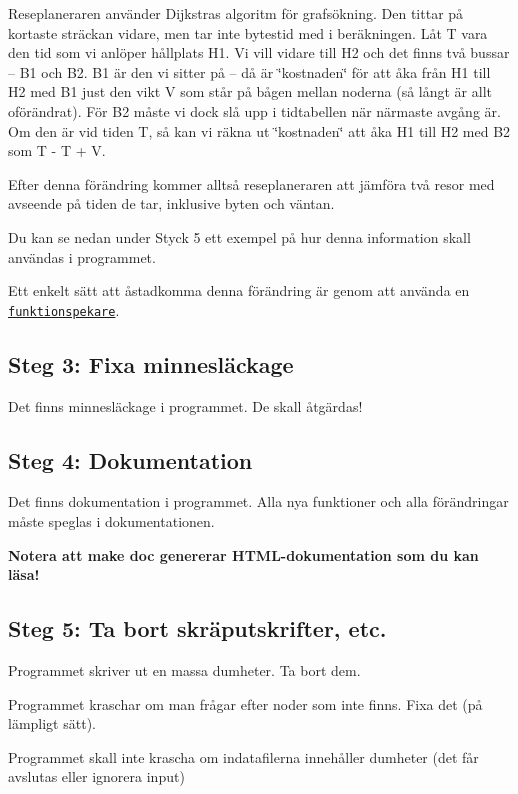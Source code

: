 Reseplaneraren använder Dijkstras algoritm för grafsökning. Den tittar på kortaste sträckan vidare, men tar inte bytestid med i beräkningen. Låt T vara den tid som vi anlöper hållplats H1. Vi vill vidare till H2 och det finns två bussar -- B1 och B2. B1 är den vi sitter på -- då är \char`\"{}kostnaden\char`\"{} för att åka från H1 till H2 med B1 just den vikt V som står på bågen mellan noderna (så långt är allt oförändrat). För B2 måste vi dock slå upp i tidtabellen när närmaste avgång är. Om den är vid tiden T\textquotesingle{}, så kan vi räkna ut \char`\"{}kostnaden\char`\"{} att åka H1 till H2 med B2 som T\textquotesingle{} -\/ T + V.

Efter denna förändring kommer alltså reseplaneraren att jämföra två resor med avseende på tiden de tar, inklusive byten och väntan.

Du kan se nedan under Styck 5 ett exempel på hur denna information skall användas i programmet.

Ett enkelt sätt att åstadkomma denna förändring är genom att använda en \href{http://c.learncodethehardway.org/book/ex18.html}{\tt funktionspekare}.

\subsection*{Steg 3\+: Fixa minnesläckage}

Det finns minnesläckage i programmet. De skall åtgärdas!

\subsection*{Steg 4\+: Dokumentation}

Det finns dokumentation i programmet. Alla nya funktioner och alla förändringar måste speglas i dokumentationen.

{\bfseries Notera att {\ttfamily make doc} genererar H\+T\+M\+L-\/dokumentation som du kan läsa!}

\subsection*{Steg 5\+: Ta bort skräputskrifter, etc.}


\begin{DoxyItemize}
\item Programmet skriver ut en massa dumheter. Ta bort dem.
\item Programmet kraschar om man frågar efter noder som inte finns. Fixa det (på lämpligt sätt).
\item Programmet skall inte krascha om indatafilerna innehåller dumheter (det får avslutas eller ignorera input)
\end{DoxyItemize}

